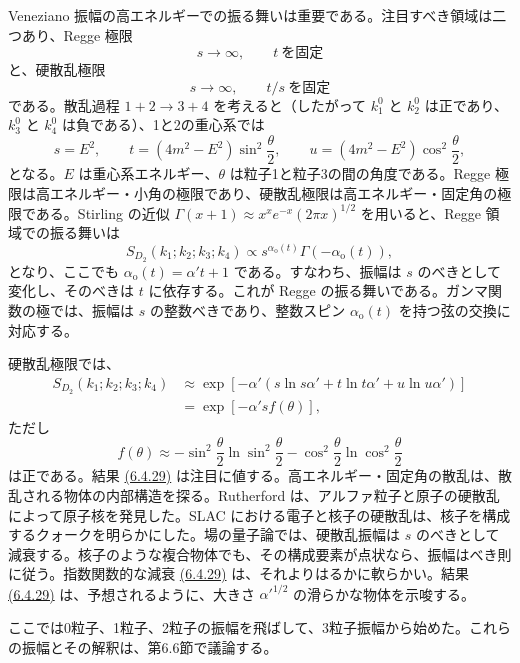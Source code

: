 Veneziano 振幅の高エネルギーでの振る舞いは重要である。注目すべき領域は二つあり、Regge 極限
\begin{equation}
s\to\infty,\qquad t\ \text{を固定}
\tag{6.4.25}\label{eq:6.4.25}
\end{equation}
と、硬散乱極限
\begin{equation}
s\to\infty,\qquad t/s\ \text{を固定}
\tag{6.4.26}\label{eq:6.4.26}
\end{equation}
である。散乱過程 $1+2\to3+4$ を考えると（したがって $k_1^0$ と $k_2^0$ は正であり、$k_3^0$ と $k_4^0$ は負である）、1と2の重心系では
\begin{equation}
s=E^2,\qquad t=(4m^2-E^2)\sin^2\frac\theta2,
\qquad u=(4m^2-E^2)\cos^2\frac\theta2,
\tag{6.4.27}\label{eq:6.4.27}
\end{equation}
となる。$E$ は重心系エネルギー、$\theta$ は粒子1と粒子3の間の角度である。Regge 極限は高エネルギー・小角の極限であり、硬散乱極限は高エネルギー・固定角の極限である。Stirling の近似 $\Gamma(x+1)\approx x^xe^{-x}(2\pi x)^{1/2}$ を用いると、Regge 領域での振る舞いは
\begin{equation}
S_{D_2}(k_1;k_2;k_3;k_4)\propto s^{\alpha_{\mathrm o}(t)}\Gamma(-\alpha_{\mathrm o}(t)),
\tag{6.4.28}\label{eq:6.4.28}
\end{equation}
となり、ここでも $\alpha_{\mathrm o}(t)=\alpha't+1$ である。すなわち、振幅は $s$ のべきとして変化し、そのべきは $t$ に依存する。これが Regge の振る舞いである。ガンマ関数の極では、振幅は $s$ の整数べきであり、整数スピン $\alpha_{\mathrm o}(t)$ を持つ弦の交換に対応する。

硬散乱極限では、
\begin{equation}
\begin{aligned}
S_{D_2}(k_1;k_2;k_3;k_4)
&\approx\exp\left[-\alpha'(s\ln s\alpha'+t\ln t\alpha'+u\ln u\alpha')\right]\\
&=\exp[-\alpha'sf(\theta)],
\end{aligned}
\tag{6.4.29}\label{eq:6.4.29}
\end{equation}
ただし
\begin{equation}
f(\theta)\approx-\sin^2\frac\theta2\ln\sin^2\frac\theta2
-\cos^2\frac\theta2\ln\cos^2\frac\theta2
\tag{6.4.30}\label{eq:6.4.30}
\end{equation}
は正である。結果 \hyperref[eq:6.4.29]{(6.4.29)} は注目に値する。高エネルギー・固定角の散乱は、散乱される物体の内部構造を探る。Rutherford は、アルファ粒子と原子の硬散乱によって原子核を発見した。SLAC における電子と核子の硬散乱は、核子を構成するクォークを明らかにした。場の量子論では、硬散乱振幅は $s$ のべきとして減衰する。核子のような複合物体でも、その構成要素が点状なら、振幅はべき則に従う。指数関数的な減衰 \hyperref[eq:6.4.29]{(6.4.29)} は、それよりはるかに軟らかい。結果 \hyperref[eq:6.4.29]{(6.4.29)} は、予想されるように、大きさ $\alpha'^{1/2}$ の滑らかな物体を示唆する。

ここでは0粒子、1粒子、2粒子の振幅を飛ばして、3粒子振幅から始めた。これらの振幅とその解釈は、第6.6節で議論する。

